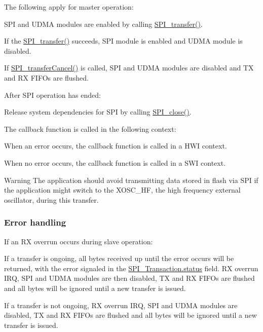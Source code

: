 The following apply for master operation\+:
\begin{DoxyItemize}
\item S\+P\+I and U\+D\+M\+A modules are enabled by calling \hyperlink{_s_p_i_8h_a989e17f96b54fcc3dc2cac5f8ac6bdb2}{S\+P\+I\+\_\+transfer()}.
\item If the \hyperlink{_s_p_i_8h_a989e17f96b54fcc3dc2cac5f8ac6bdb2}{S\+P\+I\+\_\+transfer()} succeeds, S\+P\+I module is enabled and U\+D\+M\+A module is disabled.
\item If \hyperlink{_s_p_i_8h_a6819f7761fc3505c4f885653ff8121f0}{S\+P\+I\+\_\+transfer\+Cancel()} is called, S\+P\+I and U\+D\+M\+A modules are disabled and T\+X and R\+X F\+I\+F\+Os are flushed.
\end{DoxyItemize}After S\+P\+I operation has ended\+:
\begin{DoxyItemize}
\item Release system dependencies for S\+P\+I by calling \hyperlink{_s_p_i_8h_a0e3448b30b88609fa120915e49560601}{S\+P\+I\+\_\+close()}.
\end{DoxyItemize}The callback function is called in the following context\+:
\begin{DoxyItemize}
\item When an error occurs, the callback function is called in a H\+W\+I context.
\item When no error occurs, the callback function is called in a S\+W\+I context.
\end{DoxyItemize}

\begin{DoxyWarning}{Warning}
The application should avoid transmitting data stored in flash via S\+P\+I if the application might switch to the X\+O\+S\+C\+\_\+\+H\+F, the high frequency external oscillator, during this transfer.
\end{DoxyWarning}
\subsubsection*{Error handling}

If an R\+X overrun occurs during slave operation\+:
\begin{DoxyItemize}
\item If a transfer is ongoing, all bytes received up until the error occurs will be returned, with the error signaled in the \hyperlink{struct_s_p_i___transaction_aa244504b2384411f7de17340be62128a}{S\+P\+I\+\_\+\+Transaction.\+status} field. R\+X overrun I\+R\+Q, S\+P\+I and U\+D\+M\+A modules are then disabled, T\+X and R\+X F\+I\+F\+Os are flushed and all bytes will be ignored until a new transfer is issued.
\item If a transfer is not ongoing, R\+X overrun I\+R\+Q, S\+P\+I and U\+D\+M\+A modules are disabled, T\+X and R\+X F\+I\+F\+Os are flushed and all bytes will be ignored until a new transfer is issued.
\end{DoxyItemize}

